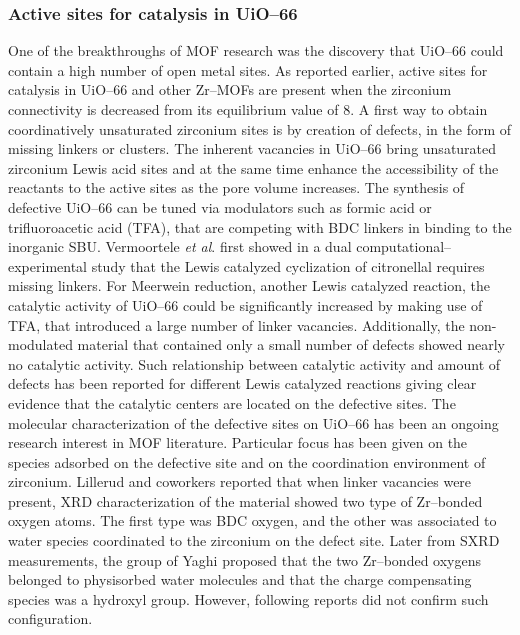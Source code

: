 \subsubsection*{Active sites for catalysis in UiO--66}
One of the breakthroughs of MOF research was the discovery that UiO--66 could contain a high number of open metal sites. As reported earlier, active sites for catalysis in UiO--66 and other Zr--MOFs are present when the zirconium connectivity is decreased from its equilibrium value of 8.
\npar
A first way to obtain coordinatively unsaturated zirconium sites is by creation of defects, in the form of missing linkers or clusters. The inherent vacancies in UiO--66 bring unsaturated zirconium Lewis acid sites\cite{wu2013unusual, shearer2014tuned, vermoortele2013synthesis, vandichel2015active, liu2016probing} and at the same time enhance the accessibility of the reactants to the active sites as the pore volume increases. The synthesis of defective UiO--66 can be tuned via modulators such as formic acid or trifluoroacetic acid (TFA), that are competing with BDC linkers in binding to the inorganic SBU. 
Vermoortele \textit{et al}. first showed in a dual computational--experimental study that the Lewis catalyzed cyclization of citronellal requires missing linkers\cite{vermoortele2012electronic}. For Meerwein reduction, another Lewis catalyzed reaction, the catalytic activity of UiO--66 could be significantly increased by making use of TFA, that introduced a large number of linker vacancies. Additionally, the non-modulated material that contained only a small number of defects showed nearly no catalytic activity\cite{vermoortele2013synthesis}. Such relationship between catalytic activity and amount of defects has been reported for different Lewis catalyzed reactions giving clear evidence that the catalytic centers are located on the defective sites\cite{vermoortele2012electronic, vermoortele2013synthesis}. 
\npar
The molecular characterization of the defective sites on UiO--66 has been an ongoing research interest in MOF literature. Particular focus has been given on the species adsorbed on the defective site and on the coordination environment of zirconium. Lillerud and coworkers \cite{oien2014detailed} reported that when linker vacancies were present, XRD characterization of the material showed two type of Zr--bonded oxygen atoms. The first type was BDC oxygen, and the other was associated to water species coordinated to the zirconium on the defect site. Later from SXRD measurements, the group of Yaghi \cite{trickett2015definitive} proposed that the two Zr--bonded oxygens belonged to physisorbed water molecules and that the charge compensating species was a hydroxyl group. However, following reports did not confirm such configuration. 
